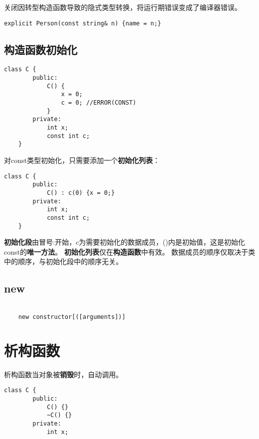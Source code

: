 关闭因转型构造函数导致的隐式类型转换，将运行期错误变成了编译器错误。

\begin{lstlisting}[frame=shadowbox]
    explicit Person(const string& n) {name = n;}    
\end{lstlisting}

\subsection{构造函数初始化}

\begin{lstlisting}[frame=shadowbox]
    class C {
        public:
            C() {
                x = 0;
                c = 0; //ERROR(CONST)
            }
        private:
            int x;
            const int c;
    }    
\end{lstlisting}

对const类型初始化，只需要添加一个\textbf{初始化列表}：

\begin{lstlisting}[frame=shadowbox]
    class C {
        public:
            C() : c(0) {x = 0;}
        private:
            int x;
            const int c;
    }    
\end{lstlisting}

\textbf{初始化段}由冒号:开始，c为需要初始化的数据成员，()内是初始值，这是初始化const的\textbf{唯一方法}。
\textbf{初始化列表}仅在\textbf{构造函数}中有效。
数据成员的顺序仅取决于类中的顺序，与初始化段中的顺序无关。


\newpage

\subsection{new}

\begin{lstlisting}[frame=shadowbox]

    new constructor[([arguments])]

\end{lstlisting}

\section{析构函数}

析构函数当对象被\textbf{销毁}时，自动调用。

\begin{lstlisting}[frame=shadowbox]
    class C {
        public:
            C() {}
            ~C() {}
        private:
            int x;
\end{lstlisting}


